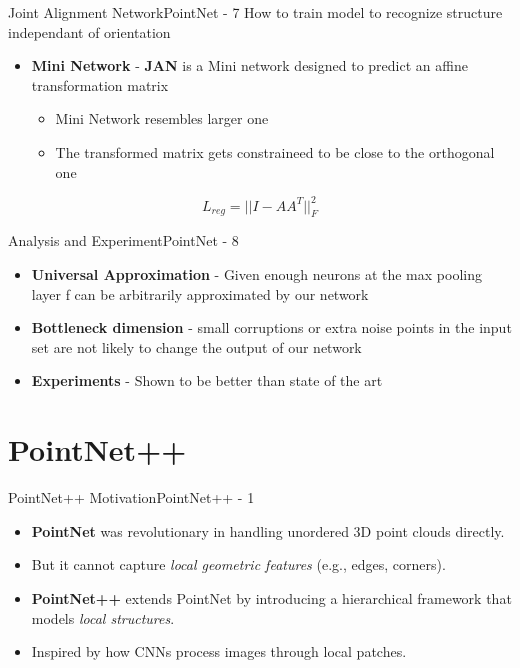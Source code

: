 \documentclass{beamer}
\begin{document}
		\begin{frame}{Joint Alignment Network}{PointNet - 7}
			How to train model to recognize structure independant of orientation
			\begin{itemize}
				\item \textbf{Mini Network} - \textbf{JAN} is a Mini network designed to predict an affine transformation matrix
                	\begin{itemize}
                        \item Mini Network resembles larger one
                        \item The transformed matrix gets constraineed to be close to the orthogonal one
        			\end{itemize}
			\end{itemize}
            \[L_{reg}=||I-AA^T||^2_F\]
		\end{frame}
		
		\begin{frame}{Analysis and Experiment}{PointNet - 8}
			\begin{itemize}
				\item \textbf{Universal Approximation} - Given enough neurons at the max pooling layer f can be arbitrarily approximated by our network
				\item \textbf{Bottleneck dimension} - small corruptions or extra noise points in the input set are not likely to change the output of our network
				\item \textbf{Experiments} - Shown to be better than state of the art
			\end{itemize}
		\end{frame}
	\section{PointNet++}
		\begin{frame}{PointNet++ Motivation}{PointNet++ - 1}
			\begin{itemize}
				\item \textbf{PointNet} was revolutionary in handling unordered 3D point clouds directly.
				\item But it cannot capture \textit{local geometric features} (e.g., edges, corners).
				\item \textbf{PointNet++} extends PointNet by introducing a hierarchical framework that models \textit{local structures}.
				\item Inspired by how CNNs process images through local patches.
			\end{itemize}
		\end{frame}
\end{document}
